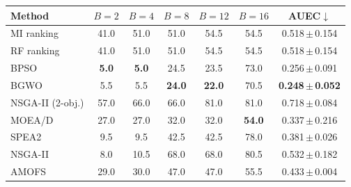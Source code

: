 \begin{tabular}{lcccccc}
\toprule
Method & $B=2$ & $B=4$ & $B=8$ & $B=12$ & $B=16$ & AUEC$\downarrow$ \\
\midrule
MI ranking & 41.0 & 51.0 & 51.0 & 54.5 & 54.5 & 0.518\,$\pm$\,0.154 \\
RF ranking & 41.0 & 51.0 & 51.0 & 54.5 & 54.5 & 0.518\,$\pm$\,0.154 \\
BPSO & \textbf{5.0} & \textbf{5.0} & 24.5 & 23.5 & 73.0 & 0.256\,$\pm$\,0.091 \\
BGWO & 5.5 & 5.5 & \textbf{24.0} & \textbf{22.0} & 70.5 & \textbf{0.248\,$\pm$\,0.052} \\
NSGA-II (2-obj.) & 57.0 & 66.0 & 66.0 & 81.0 & 81.0 & 0.718\,$\pm$\,0.084 \\
MOEA/D & 27.0 & 27.0 & 32.0 & 32.0 & \textbf{54.0} & 0.337\,$\pm$\,0.216 \\
SPEA2 & 9.5 & 9.5 & 42.5 & 42.5 & 78.0 & 0.381\,$\pm$\,0.026 \\
NSGA-II & 8.0 & 10.5 & 68.0 & 68.0 & 80.5 & 0.532\,$\pm$\,0.182 \\
AMOFS & 29.0 & 30.0 & 47.0 & 47.0 & 55.5 & 0.433\,$\pm$\,0.004 \\
\bottomrule
\end{tabular}
